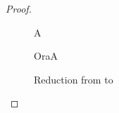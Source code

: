 \begin{proof}
\begin{figure}
\begin{center}
\begin{bbrenv}{A}
\begin{bbroracle}{OraA}
                    \begin{bbrbox}[name=$\procSignOracleId$, minheight=1cm]
                    \end{bbrbox}
                \end{bbroracle}
                \bbroutput{$\varSignature$}
            \end{bbrenv}
        \end{center}
        \caption{Reduction from \cnstWitnessExtractability to \cnstEUFCMA \label{prf:bbrwit}}
    \end{figure}

\end{proof}